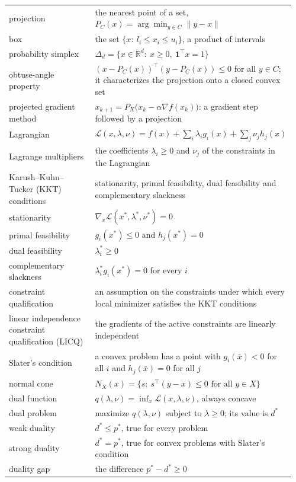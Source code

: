 \documentclass[11pt,a4paper]{article}
\begin{document}
\begin{longtable}{@{}>{\raggedright\arraybackslash}p{0.3\linewidth}>{\raggedright\arraybackslash}p{0.66\linewidth}@{}}
projection & the nearest point of a set, $P_C(x) = \arg\min_{y \in C} \|y - x\|$ \\
box & the set $\{x:\ l_i \le x_i \le u_i\}$, a product of intervals \\
probability simplex & $\Delta_d = \{x \in \mathbb R^d:\ x \ge 0,\ \mathbf 1^\top x = 1\}$ \\
obtuse-angle property & $(x - P_C(x))^\top (y - P_C(x)) \le 0$ for all $y \in C$; it characterizes the projection onto a closed convex set \\
projected gradient method & $x_{k+1} = P_X\big(x_k - \alpha \nabla f(x_k)\big)$: a gradient step followed by a projection \\
Lagrangian & $\mathcal L(x, \lambda, \nu) = f(x) + \sum_i \lambda_i g_i(x) + \sum_j \nu_j h_j(x)$ \\
Lagrange multipliers & the coefficients $\lambda_i \ge 0$ and $\nu_j$ of the constraints in the Lagrangian \\
Karush–Kuhn–Tucker (KKT) conditions & stationarity, primal feasibility, dual feasibility and complementary slackness \\
stationarity & $\nabla_x \mathcal L(x^*, \lambda^*, \nu^*) = 0$ \\
primal feasibility & $g_i(x^*) \le 0$ and $h_j(x^*) = 0$ \\
dual feasibility & $\lambda_i^* \ge 0$ \\
complementary slackness & $\lambda_i^* g_i(x^*) = 0$ for every $i$ \\
constraint qualification & an assumption on the constraints under which every local minimizer satisfies the KKT conditions \\
linear independence constraint qualification (LICQ) & the gradients of the active constraints are linearly independent \\
Slater's condition & a convex problem has a point with $g_i(\bar x) < 0$ for all $i$ and $h_j(\bar x) = 0$ for all $j$ \\
normal cone & $N_X(x) = \{s:\ s^\top (y - x) \le 0 \text{ for all } y \in X\}$ \\
dual function & $q(\lambda, \nu) = \inf_x \mathcal L(x, \lambda, \nu)$, always concave \\
dual problem & maximize $q(\lambda, \nu)$ subject to $\lambda \ge 0$; its value is $d^*$ \\
weak duality & $d^* \le p^*$, true for every problem \\
strong duality & $d^* = p^*$, true for convex problems with Slater's condition \\
duality gap & the difference $p^* - d^* \ge 0$ \\
\end{longtable}
\end{document}
